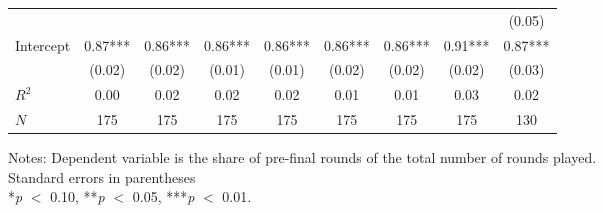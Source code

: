 \begin{table}[htbp]
\begin{threeparttable}
\begin{tabular}{l cccccccc}
                    &               &               &               &               &               &               &               &      (0.05)   \\
Intercept           &        0.87***&        0.86***&        0.86***&        0.86***&        0.86***&        0.86***&        0.91***&        0.87***\\
                    &      (0.02)   &      (0.02)   &      (0.01)   &      (0.01)   &      (0.02)   &      (0.02)   &      (0.02)   &      (0.03)   \\
\hline
$R^2$               &        0.00   &        0.02   &        0.02   &        0.02   &        0.01   &        0.01   &        0.03   &        0.02   \\
$N$                 &         175   &         175   &         175   &         175   &         175   &         175   &         175   &         130   \\
\hline
\hline
\end{tabular}
\begin{tablenotes}
\footnotesize
\item{Notes: Dependent variable is the share of pre-final rounds of the total number of rounds played. \\ Standard errors in parentheses \\ *\textit{p} $<$ 0.10, **\textit{p} $<$ 0.05, ***\textit{p} $<$ 0.01.}
\end{tablenotes}
\end{threeparttable}
\end{table}
